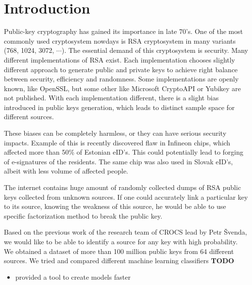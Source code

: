 \chapter*{Introduction}

Public-key cryptography has gained its importance in late 70's. One of the most commonly used cryptosystem nowdays is RSA cryptosystem in many variants (768, 1024, 3072, $\cdots$). The essential demand of this cryptosystem is security. Many different implementations of RSA exist. Each implementation chooses slightly different approach to generate public and private keys to achieve right balance between security, efficiency and randomness. Some implementations are openly known, like OpenSSL, but some other like Microsoft CryptoAPI or Yubikey are not published. With each implementation different, there is a slight bias introduced in public keys generation, which leads to distinct sample space for different sources. 

These biases can be completely harmless, or they can have serious security impacts. Example of this is recently discovered flaw in Infineon chips\cite{svenda_3}, which affected more than 50\% of Estonian eID's. This could potentially lead to forging of e-signatures of the residents. The same chip was also used in Slovak eID's, albeit with less volume of affected people.

The internet contains huge amount of randomly collected dumps of RSA public keys collected from unknown sources. If one could accurately link a particular key to its source, knowing the weakness of this source, he would be able to use specific factorization method to break the public key.

Based on the previous work\cite{svenda_1}\cite{svenda_2} of the research team of CROCS lead by Petr Švenda, we would like to be able to identify a source for any key with high probability. We obtained a dataset of more than 100 million public keys from 64 different sources. We tried and compared different machine learning classifiers \textbf{TODO}

\begin{itemize}

\item provided a tool to create models faster

\end{itemize}
